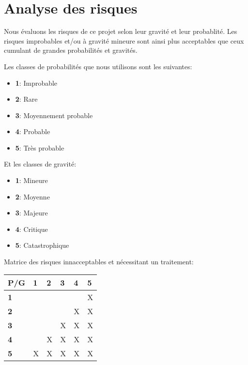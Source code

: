 \chapter*{Analyse des risques}

Nous évaluons les risques de ce projet selon leur gravité et leur probablité. Les risques improbables et/ou à gravité mineure sont ainsi plus acceptables que ceux cumulant de grandes probabilités et gravités.

Les classes de probabilités que nous utilisons sont les suivantes:

\begin{itemize}
  \item \textbf{1}: Improbable 
  \item \textbf{2}: Rare
  \item \textbf{3}: Moyennement probable
  \item \textbf{4}: Probable
  \item \textbf{5}: Très probable
\end{itemize}

Et les classes de gravité:

\begin{itemize}
  \item \textbf{1}: Mineure 
  \item \textbf{2}: Moyenne
  \item \textbf{3}: Majeure
  \item \textbf{4}: Critique
  \item \textbf{5}: Catastrophique
\end{itemize}

Matrice des risques innacceptables et nécessitant un traitement:

\begin{tabular}{|l|l|l|l|l|l|}
     \hline
         P/G & \textbf{1} & \textbf{2} & \textbf{3} & \textbf{4} & \textbf{5}  \\ \hline
         \textbf{1} &   &   &   &   & X \\ \hline
         \textbf{2} &   &   &   & X & X \\ \hline
         \textbf{3} &   &   & X & X & X \\ \hline
         \textbf{4} &   & X & X & X & X \\ \hline
         \textbf{5} & X & X & X & X & X \\
     \hline
\end{tabular}

